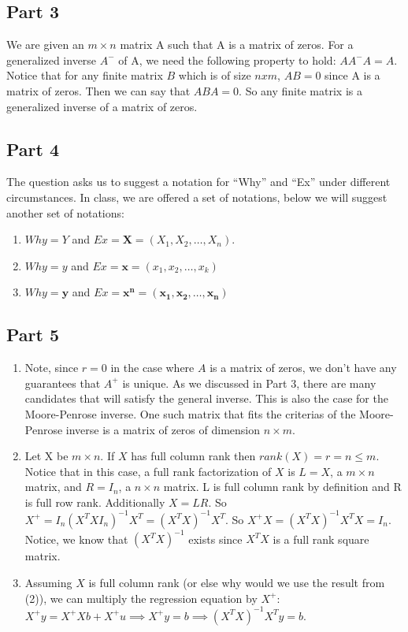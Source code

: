 \documentclass[10pt]{report}
\begin{document}
\subsection*{Part 3}
We are given an $m \times n$ matrix A such that A is a matrix of zeros. For a generalized inverse $A^-$ of A, we need the following property to hold: $A A^- A = A$. Notice that for any finite matrix $B$ which is of size $nxm$, $A B = 0$ since A is a matrix of zeros. Then we can say that $A B A =0$. So any finite matrix is a generalized inverse of a matrix of zeros. 

\subsection*{Part 4}
The question asks us to suggest a notation for ``Why'' and ``Ex'' under different circumstances. In class, we are offered a set of notations, below we will suggest another set of notations:

\begin{enumerate}[label=(\alph*)]
    \item $Why=Y$ and $Ex=\boldsymbol{X}=(X_1, X_2, \ldots, X_n)$.
    \item $Why=y$ and $Ex=\boldsymbol{x} = (x_1, x_2, \ldots, x_k)$
    \item $Why=\boldsymbol{y}$ and $Ex=\boldsymbol{x^n} = (\boldsymbol{x_1},\boldsymbol{x_2}, \ldots, \boldsymbol{x_n})$
\end{enumerate}

\subsection*{Part 5}
\begin{enumerate}[label=(\alph*)]
    \item Note, since $r=0$ in the case where $A$ is a matrix of zeros, we don't have any guarantees that $A^{+}$ is unique. As we discussed in Part 3, there are many candidates that will satisfy the general inverse. This is also the case for the Moore-Penrose inverse. One such matrix that fits the criterias of the Moore-Penrose inverse is a matrix of zeros of dimension $n \times m$.
    \item Let X be $m \times n$. If $X$ has full column rank then $rank(X)=r=n\leq m$. Notice that in this case, a full rank factorization of $X$ is $L=X$, a $m\times n$ matrix, and $R = I_n$, a $n\times n$ matrix. L is full column rank by definition and R is full row rank. Additionally $X = L R$. So $X^{+} = I_n (X^T X I_n)^{-1} X^T = (X^T X )^{-1} X^T  $. So $X^{+}X = (X^T X )^{-1} X^T X = I_n$. Notice, we know that $(X^T X )^{-1}$ exists since $X^T X$ is a full rank square matrix.
    \item Assuming $X$ is full column rank (or else why would we use the result from (2)), we can multiply the regression equation by $X^{+}$: $X^{+}y = X^{+}Xb + X^{+}u \implies X^{+}y = b \implies (X^T X )^{-1} X^T y = b$.
\end{enumerate}
\end{document}
